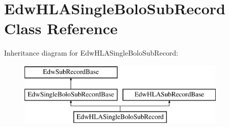 \hypertarget{class_edw_h_l_a_single_bolo_sub_record}{
\section{EdwHLASingleBoloSubRecord Class Reference}
\label{class_edw_h_l_a_single_bolo_sub_record}
}
Inheritance diagram for EdwHLASingleBoloSubRecord:\begin{figure}[H]
\begin{center}
\leavevmode
\includegraphics[height=3cm]{class_edw_h_l_a_single_bolo_sub_record}
\end{center}
\end{figure}
